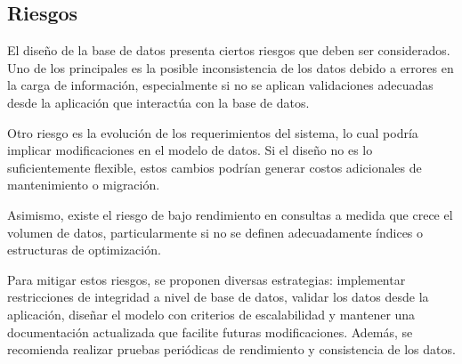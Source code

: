 \subsection{Riesgos}

El diseño de la base de datos presenta ciertos riesgos que deben ser considerados. Uno de los principales es la posible inconsistencia de los datos debido a errores en la carga de información, especialmente si no se aplican validaciones adecuadas desde la aplicación que interactúa con la base de datos.

Otro riesgo es la evolución de los requerimientos del sistema, lo cual podría implicar modificaciones en el modelo de datos. Si el diseño no es lo suficientemente flexible, estos cambios podrían generar costos adicionales de mantenimiento o migración.

Asimismo, existe el riesgo de bajo rendimiento en consultas a medida que crece el volumen de datos, particularmente si no se definen adecuadamente índices o estructuras de optimización.

Para mitigar estos riesgos, se proponen diversas estrategias: implementar restricciones de integridad a nivel de base de datos, validar los datos desde la aplicación, diseñar el modelo con criterios de escalabilidad y mantener una documentación actualizada que facilite futuras modificaciones. Además, se recomienda realizar pruebas periódicas de rendimiento y consistencia de los datos.
